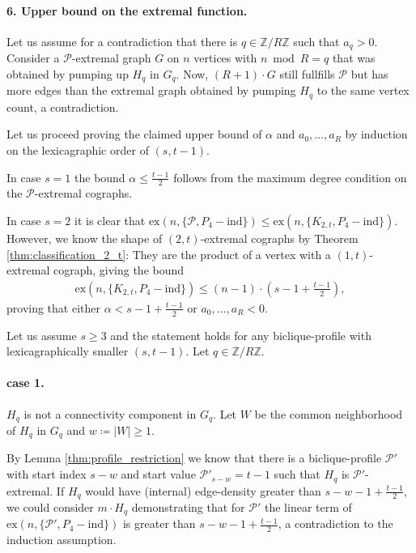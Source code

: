 \documentclass{article}
\theoremstyle{definition}
\theoremstyle{definition}
\theoremstyle{definition}
\theoremstyle{definition}
\theoremstyle{definition}
\theoremstyle{definition}
\theoremstyle{definition}
\theoremstyle{definition}
\theoremstyle{definition}
\theoremstyle{definition}
\begin{document}
    \paragraph{6. Upper bound on the extremal function.}
    Let us assume for a contradiction that there is $q \in \mathbb{Z}/R\mathbb{Z}$ such that $a_q > 0$. Consider a $\mathscr{P}$-extremal graph $G$ on $n$ vertices with $n \bmod R = q$ that was obtained by pumping up $H_q$ in $G_q$. Now, $(R+1) \cdot G$ still fullfills $\mathscr{P}$ but has more edges than the extremal graph obtained by pumping $H_q$ to the same vertex count, a contradiction.

    Let us proceed proving the claimed upper bound of $\alpha$ and $a_0, \dots, a_R$ by induction on the lexicagraphic order of $(s,t-1)$.

    In case $s = 1$ the bound $\alpha \leq \frac{t-1}{2}$ follows from the maximum degree condition on the $\mathscr{P}$-extremal cographs.

    In case $s=2$ it is clear that $\text{ex} \left( n, \{ \mathscr{P}, P_4 - \text{ind} \} \right) \leq \text{ex} \left( n, \{ K_{2,t}, P_4 - \text{ind} \} \right)$. However, we know the shape of $(2,t)$-extremal cographs by Theorem \ref{thm:classification_2_t}: They are the product of a vertex with a $(1,t)$-extremal cograph, giving the bound
    \begin{align}
        \text{ex} \left( n, \{ K_{2,t}, P_4 - \text{ind} \} \right) \leq (n-1) \cdot \left( s-1 + \frac{t-1}{2} \right),
    \end{align}
    proving that either $\alpha < s-1 + \frac{t-1}{2}$ or $a_0, \dots, a_R < 0$.
    
    Let us assume $s \geq 3$ and the statement holds for any biclique-profile with lexicagraphically smaller $(s,t-1)$.
    Let $q \in \mathbb{Z}/R\mathbb{Z}$.

    \paragraph{case 1.}
        $H_q$ is not a connectivity component in $G_q$. Let $W$ be the common neighborhood of $H_q$ in $G_q$ and $w \coloneq |W| \geq 1$.
                
        By Lemma \ref{thm:profile_restriction} we know that there is a biclique-profile $\mathscr{P}'$ with start index $s-w$ and start value $\mathscr{P}'_{s-w}=t-1$ such that $H_q$ is $\mathscr{P}'$-extremal.
        If $H_q$ would have (internal) edge-density greater than $s-w-1 + \frac{t-1}{2}$, we could consider $m \cdot H_q$ demonstrating that for $\mathscr{P}'$ the linear term of $\text{ex} \left( n, \{ \mathscr{P}', P_4 - \text{ind} \} \right)$ is greater than $s-w-1 + \frac{t-1}{2}$, a contradiction to the induction assumption.
        
\end{document}
